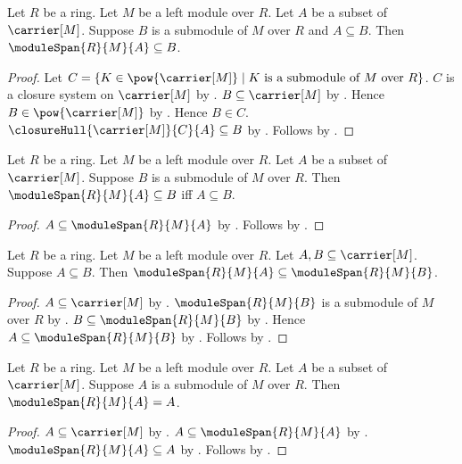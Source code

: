 \begin{theorem}\label{module_span_least}
    Let $R$ be a ring.
    Let $M$ be a left module over $R$.
    Let $A$ be a subset of $\carrier[M]$.
    Suppose $B$ is a submodule of $M$ over $R$ and $A\subseteq B$.
    Then $\moduleSpan{R}{M}{A}\subseteq B$.
\end{theorem}
\begin{proof}
    Let
        $C=\{K\in\pow{\carrier[M]}\mid
            \text{$K$ is a submodule of $M$ over $R$}\}$.
    $C$ is a closure system on $\carrier[M]$ by
        .
    $B\subseteq\carrier[M]$ by .
    Hence $B\in\pow{\carrier[M]}$ by .
    Hence $B\in C$.
    $\closureHull{\carrier[M]}{C}{A}\subseteq B$ by
        .
    Follows by .
\end{proof}

\begin{theorem}\label{module_span_universal_property}
    Let $R$ be a ring.
    Let $M$ be a left module over $R$.
    Let $A$ be a subset of $\carrier[M]$.
    Suppose $B$ is a submodule of $M$ over $R$.
    Then $\moduleSpan{R}{M}{A}\subseteq B$ iff $A\subseteq B$.
\end{theorem}
\begin{proof}
    $A\subseteq\moduleSpan{R}{M}{A}$ by
        .
    Follows by .
\end{proof}

\begin{proposition}\label{module_span_monotone}
    Let $R$ be a ring.
    Let $M$ be a left module over $R$.
    Let $A,B\subseteq\carrier[M]$.
    Suppose $A\subseteq B$.
    Then $\moduleSpan{R}{M}{A}\subseteq\moduleSpan{R}{M}{B}$.
\end{proposition}
\begin{proof}
    $A\subseteq\carrier[M]$ by .
    $\moduleSpan{R}{M}{B}$ is a submodule of $M$ over $R$ by
        .
    $B\subseteq\moduleSpan{R}{M}{B}$ by
        .
    Hence $A\subseteq\moduleSpan{R}{M}{B}$ by
        .
    Follows by .
\end{proof}

\begin{corollary}\label{module_span_of_submodule}
    Let $R$ be a ring.
    Let $M$ be a left module over $R$.
    Let $A$ be a subset of $\carrier[M]$.
    Suppose $A$ is a submodule of $M$ over $R$.
    Then $\moduleSpan{R}{M}{A}=A$.
\end{corollary}
\begin{proof}
    $A\subseteq\carrier[M]$ by .
    $A\subseteq\moduleSpan{R}{M}{A}$ by
        .
    $\moduleSpan{R}{M}{A}\subseteq A$ by
        .
    Follows by .
\end{proof}

